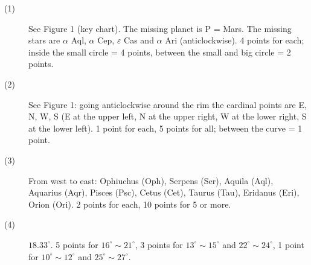 \begin{description}
\item[(1)] See Figure 1 (key chart). The missing planet is P = Mars. The
  missing stars are $\alpha$ Aql, $\alpha$ Cep, $\varepsilon$ Cas and
  $\alpha$ Ari (anticlockwise). 4 points for each; inside the small circle
  = 4 points, between the small and big circle = 2 points.
\item[(2)] See Figure 1: going anticlockwise around the rim the cardinal
  points are E, N, W, S (E at the upper left, N at the upper right, W at
  the lower right, S at the lower left). 1 point for each, 5 points for
  all; between the curve = 1 point.
\item[(3)] From west to east: Ophiuchus (Oph), Serpens (Ser), Aquila (Aql),
  Aquarius (Aqr), Pisces (Psc), Cetus (Cet), Taurus (Tau), Eridanus (Eri),
  Orion (Ori). 2 points for each, 10 points for 5 or more.
\item[(4)] $18.33^\circ$. 5 points for $16^\circ \sim 21^\circ$, 3 points
  for $13^\circ \sim 15^\circ$ and $22^\circ \sim 24^\circ$, 1 point for
  $10^\circ \sim 12^\circ$ and $25^\circ \sim 27^\circ$.
\end{description}
